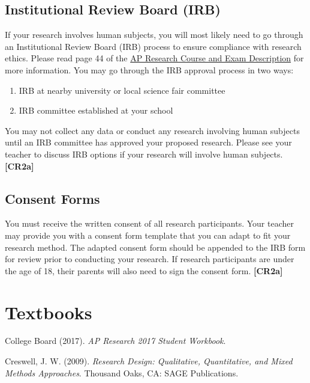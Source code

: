 \documentclass[11pt,]{article}
\providecommand{\tightlist}{%
  \setlength{\itemsep}{0pt}\setlength{\parskip}{0pt}}
\begin{document}
\hypertarget{institutional-review-board-irb}{%
\subsection{Institutional Review Board (IRB)}\label{institutional-review-board-irb}}

If your research involves human subjects, you will most likely need to go through an Institutional Review Board (IRB) process to ensure compliance with research ethics. Please read page 44 of the \href{https://apcentral.collegeboard.org/pdf/ap-research-course-and-exam-description.pdf}{AP Research Course and Exam Description} for more information. You may go through the IRB approval process in two ways:

\begin{enumerate}
\def\labelenumi{\arabic{enumi}.}
\tightlist
\item
  IRB at nearby university or local science fair committee
\item
  IRB committee established at your school
\end{enumerate}

You may not collect any data or conduct any research involving human subjects until an IRB committee has approved your proposed research. Please see your teacher to discuss IRB options if your research will involve human subjects. \textbf{{[}CR2a{]}} 

\hypertarget{consent-forms}{%
\subsection{Consent Forms}\label{consent-forms}}

You must receive the written consent of all research participants. Your teacher may provide you with a consent form template that you can adapt to fit your research method. The adapted consent form should be appended to the IRB form for review prior to conducting your research. If research participants are under the age of 18, their parents will also need to sign the consent form. \textbf{{[}CR2a{]}} 

\hypertarget{textbooks}{%
\section{Textbooks}\label{textbooks}}

College Board (2017). \emph{AP Research 2017 Student Workbook}.

Creswell, J. W. (2009). \emph{Research Design: Qualitative,
Quantitative, and Mixed Methods Approaches}. Thousand Oaks, CA:
SAGE Publications.
\end{document}
